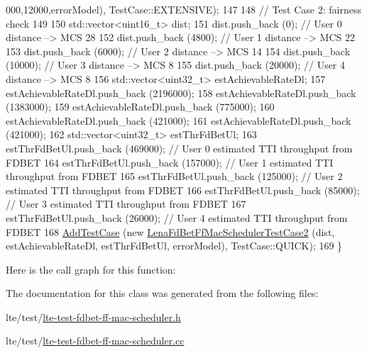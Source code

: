\begin{DoxyCode}
      000,12000,errorModel), TestCase::EXTENSIVE);
147 
148   \textcolor{comment}{// Test Case 2: fairness check}
149 
150   std::vector<uint16\_t> dist;
151   dist.push\_back (0);       \textcolor{comment}{// User 0 distance --> MCS 28}
152   dist.push\_back (4800);    \textcolor{comment}{// User 1 distance --> MCS 22}
153   dist.push\_back (6000);    \textcolor{comment}{// User 2 distance --> MCS 14}
154   dist.push\_back (10000);    \textcolor{comment}{// User 3 distance --> MCS 8}
155   dist.push\_back (20000);    \textcolor{comment}{// User 4 distance --> MCS 8}
156   std::vector<uint32\_t> estAchievableRateDl;
157   estAchievableRateDl.push\_back (2196000);
158   estAchievableRateDl.push\_back (1383000);
159   estAchievableRateDl.push\_back (775000);
160   estAchievableRateDl.push\_back (421000);
161   estAchievableRateDl.push\_back (421000);
162   std::vector<uint32\_t> estThrFdBetUl;
163   estThrFdBetUl.push\_back (469000); \textcolor{comment}{// User 0 estimated TTI throughput from FDBET}
164   estThrFdBetUl.push\_back (157000); \textcolor{comment}{// User 1 estimated TTI throughput from FDBET}
165   estThrFdBetUl.push\_back (125000); \textcolor{comment}{// User 2 estimated TTI throughput from FDBET}
166   estThrFdBetUl.push\_back (85000);  \textcolor{comment}{// User 3 estimated TTI throughput from FDBET}
167   estThrFdBetUl.push\_back (26000);  \textcolor{comment}{// User 4 estimated TTI throughput from FDBET}
168   \hyperlink{classns3_1_1TestCase_a3718088e3eefd5d6454569d2e0ddd835}{AddTestCase} (\textcolor{keyword}{new} \hyperlink{classLenaFdBetFfMacSchedulerTestCase2}{LenaFdBetFfMacSchedulerTestCase2} (dist, 
      estAchievableRateDl, estThrFdBetUl, errorModel), TestCase::QUICK);
169 \}
\end{DoxyCode}


Here is the call graph for this function\+:




The documentation for this class was generated from the following files\+:\begin{DoxyCompactItemize}
\item 
lte/test/\hyperlink{lte-test-fdbet-ff-mac-scheduler_8h}{lte-\/test-\/fdbet-\/ff-\/mac-\/scheduler.\+h}\item 
lte/test/\hyperlink{lte-test-fdbet-ff-mac-scheduler_8cc}{lte-\/test-\/fdbet-\/ff-\/mac-\/scheduler.\+cc}\end{DoxyCompactItemize}

